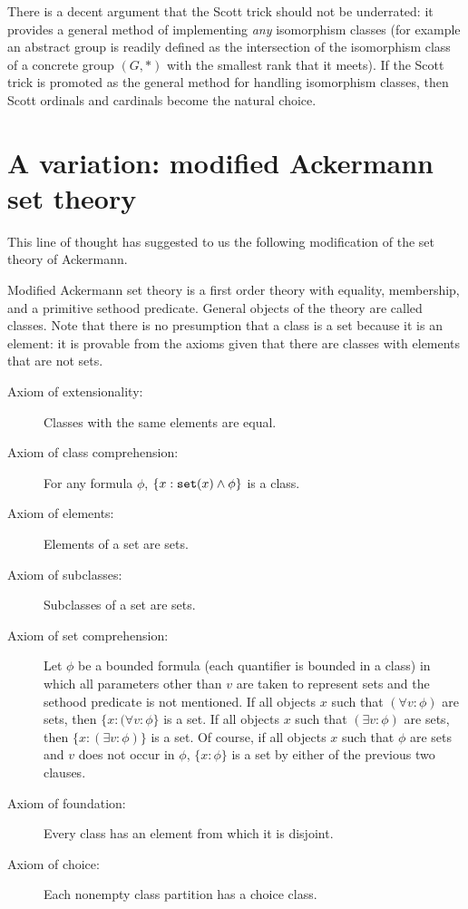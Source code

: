 \documentclass[12pt]{article}
\begin{document}
There is a decent argument that the Scott trick should not be underrated:  it provides a general method of implementing {\em any\/} isomorphism classes (for example an abstract group is readily defined as the intersection of the isomorphism class of a concrete group $(G,*)$ with the smallest rank that it meets).  If the Scott trick is promoted as the general method for handling isomorphism classes, then Scott ordinals and cardinals become the natural choice.

\section{A variation:  modified Ackermann set theory}

This line of thought has suggested to us the following modification of the set theory of Ackermann.

Modified Ackermann set theory is a first order theory with equality, membership, and a primitive sethood predicate.  General objects of the theory are called classes.  Note that there is no presumption that a class is a set because it is an element:  it is provable from the axioms given that there are classes with elements that are not sets.

\begin{description}

\item[Axiom of extensionality:]  Classes with the same elements are equal.

\item[Axiom of class comprehension:]  For any formula $\phi$, $\{x:{\tt set}(x) \wedge \phi\}$ is a class.

\item[Axiom of elements:]  Elements of a set are sets.

\item[Axiom of subclasses:]  Subclasses of a set are sets.

\item[Axiom of set comprehension:]  Let $\phi$ be a bounded formula (each quantifier is bounded in a class) in which all parameters other than $v$ are taken to represent sets and the sethood predicate is not mentioned.  If all objects $x$ such that $(\forall v:\phi)$ are sets, then $\{x:(\forall v:\phi\}$ is a set.  If all objects $x$ such that $(\exists v:\phi)$ are sets, then $\{x:(\exists v:\phi)\}$ is a set.  Of course, if all objects $x$ such that $\phi$ are sets and $v$ does not occur in $\phi$, $\{x : \phi\}$ is a set by either of the previous two clauses.

\item[Axiom of foundation:]  Every class has an element from which it is disjoint.

\item[Axiom of choice:]  Each nonempty class partition has a choice class.

\end{description}
\end{document}
